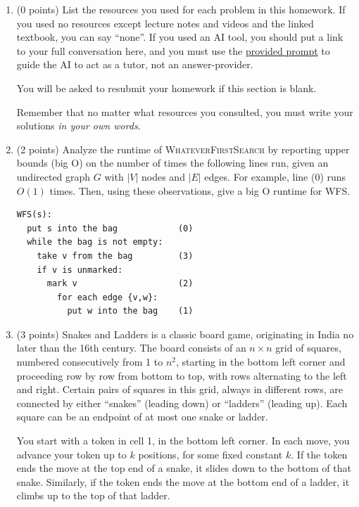 \documentclass[11pt]{article}
\begin{document}


\begin{enumerate}


\item (0 points) List the resources you used for each problem in this homework. If you used no resources except
lecture notes and videos and the linked textbook, you can say ``none''. If you used
an AI tool, you should put a link to your full conversation here, and you must
use the
\href{https://umaal.org/files/teaching/csci332_fall2026/agents.md}{provided
prompt}
 to guide the AI to act
as a tutor, not an answer-provider.

You will be asked to resubmit your homework if this section is blank.

Remember that no matter what resources you consulted, you must write your solutions
\emph{in your own words}.

\item (2 points) Analyze the runtime of \textsc{WhateverFirstSearch} by
reporting upper bounds (big O) on the number of times the following lines
run, given an undirected graph $G$ with $|V|$ nodes and $|E|$ edges. For example,
line (0) runs $O(1)$ times. Then, using these observations, give a big O runtime for
WFS.

\begin{verbatim}
WFS(s):
  put s into the bag            (0)
  while the bag is not empty:
    take v from the bag         (3)
    if v is unmarked:
      mark v                    (2)
        for each edge {v,w}:
          put w into the bag    (1)
\end{verbatim}

\item (3 points) Snakes and Ladders is a classic board game, originating in
India no later than the 16th century. The board consists of an $n \times n$ grid
of squares, 
numbered consecutively from 1 to $n^2$, starting in the bottom left corner and
proceeding row by row from bottom to top, with rows alternating to the
left and right. Certain pairs of squares in this grid, always in different rows,
are connected by either “snakes” (leading down) or “ladders” (leading up).
Each square can be an endpoint of at most one snake or ladder.

You start with a token in cell 1, in the bottom left corner. In each move,
you advance your token up to $k$ positions, for some fixed constant $k$. If the
token ends the move at the top end of a snake, it slides down to the bottom
of that snake. Similarly, if the token ends the move at the bottom end of a
ladder, it climbs up to the top of that ladder.


\end{enumerate}
\end{document}
